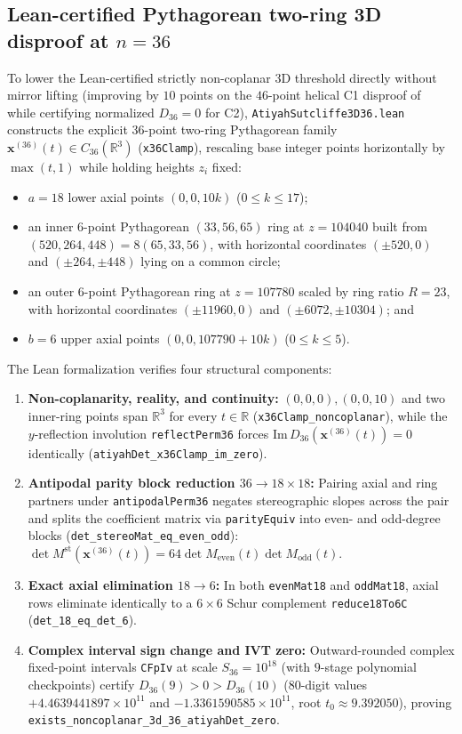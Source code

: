 \documentclass[11pt,reqno]{amsart}
\theoremstyle{remark}
\newcommand{\R}{\mathbb{R}}
\begin{document}
\subsection{Lean-certified Pythagorean two-ring 3D disproof at $n = 36$}\label{sec:3d36}
To lower the Lean-certified strictly non-coplanar 3D threshold directly without mirror lifting (improving by $10$ points on the $46$-point helical C1 disproof of~\cite{Akhtyamov2026} while certifying normalized $D_{36} = 0$ for C2), \texttt{AtiyahSutcliffe3D36.lean} constructs the explicit $36$-point two-ring Pythagorean family $\mathbf{x}^{(36)}(t) \in C_{36}(\R^3)$ (\texttt{x36Clamp}), rescaling base integer points horizontally by $\max(t, 1)$ while holding heights $z_i$ fixed:
\begin{itemize}
  \item $a = 18$ lower axial points $(0, 0, 10k)$ ($0 \le k \le 17$);
  \item an inner $6$-point Pythagorean $(33, 56, 65)$ ring at $z = 104040$ built from $(520, 264, 448) = 8(65, 33, 56)$, with horizontal coordinates $(\pm 520, 0)$ and $(\pm 264, \pm 448)$ lying on a common circle;
  \item an outer $6$-point Pythagorean ring at $z = 107780$ scaled by ring ratio $R = 23$, with horizontal coordinates $(\pm 11960, 0)$ and $(\pm 6072, \pm 10304)$; and
  \item $b = 6$ upper axial points $(0, 0, 107790 + 10k)$ ($0 \le k \le 5$).
\end{itemize}
The Lean formalization verifies four structural components:
\begin{enumerate}
  \item \textbf{Non-coplanarity, reality, and continuity:} $(0,0,0), (0,0,10)$ and two inner-ring points span $\R^3$ for every $t \in \R$ (\texttt{x36Clamp\_noncoplanar}), while the $y$-reflection involution \texttt{reflectPerm36} forces $\mathrm{Im}\, D_{36}(\mathbf{x}^{(36)}(t)) = 0$ identically (\texttt{atiyahDet\_x36Clamp\_im\_zero}).
  \item \textbf{Antipodal parity block reduction $36 \to 18 \times 18$:} Pairing axial and ring partners under \texttt{antipodalPerm36} negates stereographic slopes across the pair and splits the coefficient matrix via \texttt{parityEquiv} into even- and odd-degree blocks (\texttt{det\_stereoMat\_eq\_even\_odd}): $\det M^{\mathrm{st}}(\mathbf{x}^{(36)}(t)) = 64 \det M_{\mathrm{even}}(t) \det M_{\mathrm{odd}}(t)$.
  \item \textbf{Exact axial elimination $18 \to 6$:} In both \texttt{evenMat18} and \texttt{oddMat18}, axial rows eliminate identically to a $6 \times 6$ Schur complement \texttt{reduce18To6C} (\texttt{det\_18\_eq\_det\_6}).
  \item \textbf{Complex interval sign change and IVT zero:} Outward-rounded complex fixed-point intervals \texttt{CFpIv} at scale $S_{36} = 10^{18}$ (with $9$-stage polynomial checkpoints) certify $D_{36}(9) > 0 > D_{36}(10)$ (80-digit values $+4.4639441897 \times 10^{11}$ and $-1.3361590585 \times 10^{11}$, root $t_0 \approx 9.392050$), proving \texttt{exists\_noncoplanar\_3d\_36\_atiyahDet\_zero}.
\end{enumerate}
\end{document}
